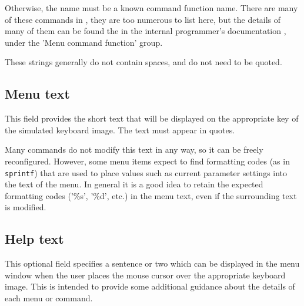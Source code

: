 Otherwise, the name must be a known command function name. There are
many of these commands in \display{}, they are too numerous to list
here, but the details of many of them can be found the in the internal
programmer's documentation , under the 'Menu command function' group.

These strings generally do not contain spaces, and do not need to be quoted.

\subsection{Menu text}
This field provides the short text that will be displayed on the appropriate key
of the simulated keyboard image. The text must appear in quotes.

Many commands do not modify this text in any way, so it can be freely
reconfigured. However, some menu items expect to find formatting codes
(as in { \tt sprintf}) that are used to place values such as current
parameter settings into the text of the menu. In general it is a good idea to 
retain the expected formatting codes ('\%s', '\%d', etc.) in the menu text, even if the surrounding text is modified.
\subsection{Help text}

This optional field specifies a sentence or two which can be displayed
in the menu window when the user places the mouse cursor over the
appropriate keyboard image. This is intended to provide some
additional guidance about the details of each menu or command.
